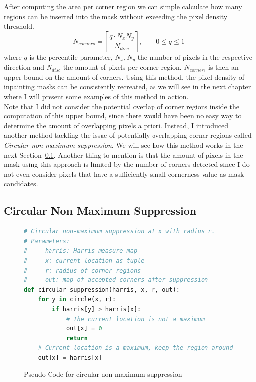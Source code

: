 After computing the area per corner region we can simple calculate how many regions can be inserted
into the mask without exceeding the pixel density threshold.
\begin{equation}
    N_{corners} = \left\lceil \frac{q \cdot N_{x}N_{y}}{N_{disc}} \right\rceil,\qquad0\leq q\leq 1 
\end{equation}
where $q$ is the percentile parameter, $N_x, N_y$ the number of pixels in the respective direction
and $N_{disc}$ the amount of pixels per corner region. $N_{corners}$ is then an upper bound on the
amount of corners.
Using this method, the pixel density of inpainting masks can be consistently recreated, as we will
see in the next chapter where I will present some examples of this method in action.\\
Note that I did not consider the potential overlap of corner regions inside the
computation of this upper bound, since there would have been no easy way to determine the amount of
overlapping pixels a priori.
Instead, I introduced another method tackling the issue of potentially overlapping corner regions
called \textit{Circular non-maximum suppression}. We will see how this method
works in the next Section~\ref{sub:Suppression}.
Another thing to mention is that the amount of pixels in the mask using this approach is limited by
the number of corners detected since I do not even consider pixels that have a sufficiently small
cornerness value as mask candidates.

\subsection{Circular Non Maximum Suppression}\label{sub:Suppression}
\begin{figure}[t]
    \begin{lstlisting}[language=Python]
# Circular non-maximum suppression at x with radius r.
# Parameters:
#    -harris: Harris measure map
#    -x: current location as tuple
#    -r: radius of corner regions
#    -out: map of accepted corners after suppression
def circular_suppression(harris, x, r, out):
    for y in circle(x, r):
        if harris[y] > harris[x]:
            # The current location is not a maximum
            out[x] = 0
            return
    # Current location is a maximum, keep the region around it
    out[x] = harris[x]
    \end{lstlisting}
    \caption{Pseudo-Code for circular non-maximum suppression}
\end{figure}

